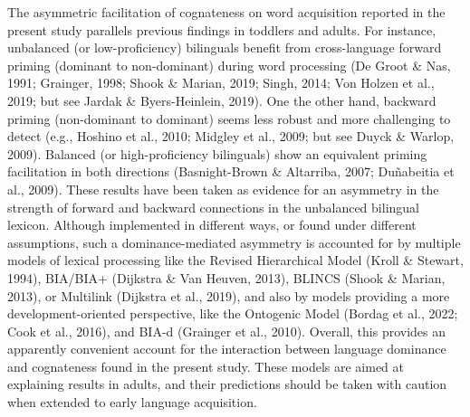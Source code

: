 \documentclass[
  12pt,
  b5paperpaper,
  twoside]{scrreprt}
\begin{document}
The asymmetric facilitation of cognateness on word acquisition reported
in the present study parallels previous findings in toddlers and adults.
For instance, unbalanced (or low-proficiency) bilinguals benefit from
cross-language forward priming (dominant to non-dominant) during word
processing (De Groot \& Nas, 1991; Grainger, 1998; Shook \& Marian,
2019; Singh, 2014; Von Holzen et al., 2019; but see Jardak \&
Byers-Heinlein, 2019). One the other hand, backward priming
(non-dominant to dominant) seems less robust and more challenging to
detect (e.g., Hoshino et al., 2010; Midgley et al., 2009; but see Duyck
\& Warlop, 2009). Balanced (or high-proficiency bilinguals) show an
equivalent priming facilitation in both directions (Basnight-Brown \&
Altarriba, 2007; Duñabeitia et al., 2009). These results have been taken
as evidence for an asymmetry in the strength of forward and backward
connections in the unbalanced bilingual lexicon. Although implemented in
different ways, or found under different assumptions, such a
dominance-mediated asymmetry is accounted for by multiple models of
lexical processing like the Revised Hierarchical Model (Kroll \&
Stewart, 1994), BIA/BIA+ (Dijkstra \& Van Heuven, 2013), BLINCS (Shook
\& Marian, 2013), or Multilink (Dijkstra et al., 2019), and also by
models providing a more development-oriented perspective, like the
Ontogenic Model (Bordag et al., 2022; Cook et al., 2016), and BIA-d
(Grainger et al., 2010). Overall, this provides an apparently convenient
account for the interaction between language dominance and cognateness
found in the present study. These models are aimed at explaining results
in adults, and their predictions should be taken with caution when
extended to early language acquisition.
\end{document}
